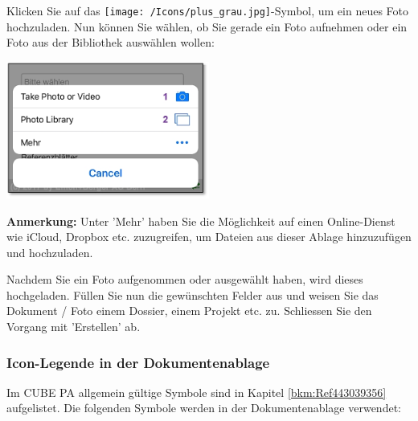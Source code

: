 Klicken Sie auf das \texttt{[image: /Icons/plus\_grau.jpg]}-Symbol, um ein neues Foto hochzuladen. Nun können Sie wählen, ob Sie gerade ein Foto aufnehmen oder ein Foto aus der Bibliothek auswählen wollen:

\vspace{\baselineskip}

\hspace{15mm} \includegraphics[height=45mm]{../chapters/11_Dokumentenablage/pictures/11-mob09_Foto_aufnehmen.jpg}

\vspace{\baselineskip}

\textbf{Anmerkung:} Unter 'Mehr' haben Sie die Möglichkeit auf einen Online-Dienst wie iCloud, Dropbox etc. zuzugreifen, um Dateien aus dieser Ablage hinzuzufügen und hochzuladen.

\vspace{\baselineskip}

Nachdem Sie ein Foto aufgenommen oder ausgewählt haben, wird dieses hochgeladen. Füllen Sie nun die gewünschten Felder aus und weisen Sie das Dokument / Foto einem Dossier, einem Projekt etc. zu. Schliessen Sie den Vorgang mit 'Erstellen' ab.



\pagebreak

\subsubsection{Icon-Legende in der Dokumentenablage}

Im CUBE PA allgemein gültige Symbole sind in Kapitel \ref{bkm:Ref443039356} aufgelistet. Die folgenden Symbole werden in der Dokumentenablage verwendet:

